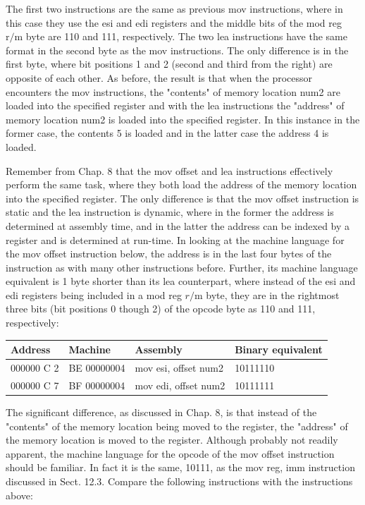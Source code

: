 \documentclass[10pt]{book}
\begin{document}
The first two instructions are the same as previous mov instructions, where in this case they use the esi and edi registers and the middle bits of the mod reg $\mathrm{r} / \mathrm{m}$ byte are 110 and 111, respectively. The two lea instructions have the same format in the second byte as the mov instructions. The only difference is in the first byte, where bit positions 1 and 2 (second and third from the right) are opposite of each other. As before, the result is that when the processor encounters the mov instructions, the "contents" of memory location num2 are loaded into the specified register and with the lea instructions the "address" of memory location num2 is loaded into the specified register. In this instance in the former case, the contents 5 is loaded and in the latter case the address 4 is loaded.


Remember from Chap. 8 that the mov offset and lea instructions effectively perform the same task, where they both load the address of the memory location into the specified register. The only difference is that the mov offset instruction is static and the lea instruction is dynamic, where in the former the address is determined at assembly time, and in the latter the address can be indexed by a register and is determined at run-time. In looking at the machine language for the mov offset instruction below, the address is in the last four bytes of the instruction as with many other instructions before. Further, its machine language equivalent is 1 byte shorter than its lea counterpart, where instead of the esi and edi registers being included in a mod reg $r / \mathrm{m}$ byte, they are in the rightmost three bits (bit positions 0 though 2) of the opcode byte as 110 and 111, respectively:

\begin{center}
\begin{tabular}{|l|l|l|l|}
\hline
Address & Machine & Assembly & Binary equivalent \\
\hline
000000 C 2 & BE 00000004 & mov esi, offset num2 & 10111110 \\
\hline
000000 C 7 & BF 00000004 & mov edi, offset num2 & 10111111 \\
\hline
\end{tabular}
\end{center}

The significant difference, as discussed in Chap. 8, is that instead of the "contents" of the memory location being moved to the register, the "address" of the memory location is moved to the register. Although probably not readily apparent, the machine language for the opcode of the mov offset instruction should be familiar. In fact it is the same, 10111, as the mov reg, imm instruction discussed in Sect. 12.3. Compare the following instructions with the instructions above:
\end{document}
